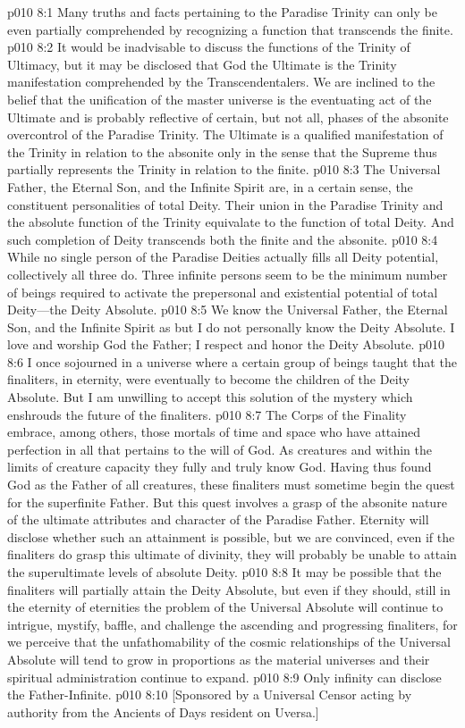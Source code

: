 \vs p010 8:1 Many truths and facts pertaining to the Paradise Trinity can only be even partially comprehended by recognizing a function that transcends the finite.
\vs p010 8:2 It would be inadvisable to discuss the functions of the Trinity of Ultimacy, but it may be disclosed that God the Ultimate is the Trinity manifestation comprehended by the Transcendentalers. We are inclined to the belief that the unification of the master universe is the eventuating act of the Ultimate and is probably reflective of certain, but not all, phases of the absonite overcontrol of the Paradise Trinity. The Ultimate is a qualified manifestation of the Trinity in relation to the absonite only in the sense that the Supreme thus partially represents the Trinity in relation to the finite.
\pc \vs p010 8:3 The Universal Father, the Eternal Son, and the Infinite Spirit are, in a certain sense, the constituent personalities of total Deity. Their union in the Paradise Trinity and the absolute function of the Trinity equivalate to the function of total Deity. And such completion of Deity transcends both the finite and the absonite.
\vs p010 8:4 While no single person of the Paradise Deities actually fills all Deity potential, collectively all three do. Three infinite persons seem to be the minimum number of beings required to activate the prepersonal and existential potential of total Deity---the Deity Absolute.
\vs p010 8:5 We know the Universal Father, the Eternal Son, and the Infinite Spirit as  but I do not personally know the Deity Absolute. I love and worship God the Father; I respect and honor the Deity Absolute.\plusone
\pc \vs p010 8:6 I once sojourned in a universe where a certain group of beings taught that the finaliters, in eternity, were eventually to become the children of the Deity Absolute. But I am unwilling to accept this solution of the mystery which enshrouds the future of the finaliters.
\vs p010 8:7 The Corps of the Finality embrace, among others, those mortals of time and space who have attained perfection in all that pertains to the will of God. As creatures and within the limits of creature capacity they fully and truly know God. Having thus found God as the Father of all creatures, these finaliters must sometime begin the quest for the superfinite Father. But this quest involves a grasp of the absonite nature of the ultimate attributes and character of the Paradise Father. Eternity will disclose whether such an attainment is possible, but we are convinced, even if the finaliters do grasp this ultimate of divinity, they will probably be unable to attain the superultimate levels of absolute Deity.
\vs p010 8:8 It may be possible that the finaliters will partially attain the Deity Absolute, but even if they should, still in the eternity of eternities the problem of the Universal Absolute will continue to intrigue, mystify, baffle, and challenge the ascending and progressing finaliters, for we perceive that the unfathomability of the cosmic relationships of the Universal Absolute will tend to grow in proportions as the material universes and their spiritual administration continue to expand.
\pc \vs p010 8:9 Only infinity can disclose the Father\hyp{}Infinite.
\vsetoff
\vs p010 8:10 [Sponsored by a Universal Censor acting by authority from the Ancients of Days resident on Uversa.]
